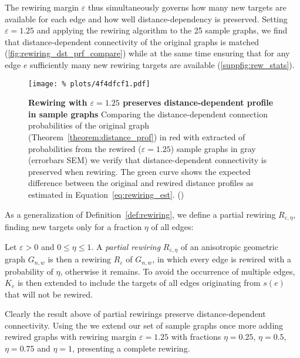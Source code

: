 The rewiring margin $\varepsilon$ thus simultaneously governs how many
new targets are available for each edge and how well
distance-dependency is preserved. Setting $\varepsilon = 1.25$ %
and applying the rewiring algorithm to the 25 sample graphs, we find
that distance-dependent connectivity of the original graphs is matched
(\autoref{fig:rewiring_dst_prf_compare}) while at the same time
ensuring that for any edge $e$ sufficiently many new rewiring targets
are available (\autoref{suppfig:rew_stats}).

\begin{figure}[H]
  \centering
  \texttt{[image: \%
    plots/4f4dfcf1.pdf]} 
  \captionsetup{skip=0pt}
  \caption{\textbf{Rewiring with \boldmath$\varepsilon = 1.25$
      preserves distance-dependent profile in sample graphs} Comparing
    the distance-dependent connection probabilities of the original
    graph (Theorem~\ref{theorem:distance_prof}) in red with extracted
    of probabilities from the rewired ($\varepsilon = 1.25$) sample
    graphs in gray (errorbars SEM) we verify that distance-dependent
    connectivity is preserved when rewiring. The green curve shows the
    expected difference between the original and rewired
    distance profiles as estimated in
    Equation~\ref{eq:rewiring_est}. ()}
  \label{fig:rewiring_dst_prf_compare}
\end{figure}


As a generalization of Definition~\ref{def:rewiring}, we define a
partial rewiring $R_{\varepsilon, \eta}$, finding new targets only for
a fraction $\eta$ of all edges:

\begin{definition}Let $\varepsilon > 0$ and $0 \leq \eta \leq 1$. A
  \textit{partial rewiring} $R_{\varepsilon,\eta}$ of an anisotropic
  geometric graph $G_{n,w}$ is then a rewiring $R_{\varepsilon}$ of
  $G_{n,w}$, in which every edge is rewired with a probability of
  $\eta$, otherwise it remains. To avoid the occurrence of multiple
  edges, $K_e$ is then extended to include the targets of all edges
  originating from $s(e)$ that will not be rewired.
\end{definition}

Clearly the result above of  partial rewirings preserve
distance-dependent connectivity. Using the we extend our set of sample
graphs once more adding rewired graphs with rewiring margin
$\varepsilon = 1.25$ %
with fractions $\eta = 0.25$, $\eta = 0.5$, $\eta = 0.75$ and $\eta =
1$, presenting a complete rewiring.





